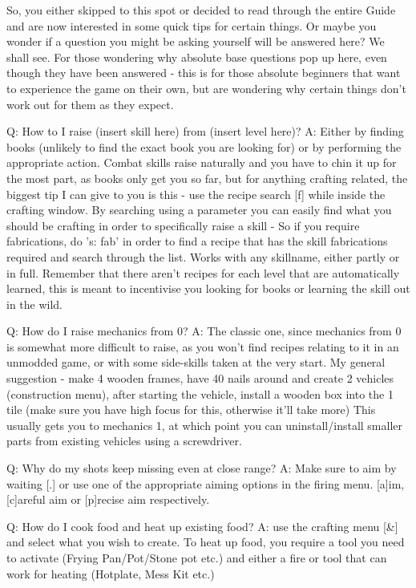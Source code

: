 \documentclass[11pt]{report}
\begin{document}
So, you either skipped to this spot or decided to read through the entire Guide and are now interested in some quick tips for certain things. Or maybe you wonder if a question you might be asking yourself will be answered here? We shall see. For those wondering why absolute base questions pop up here, even though they have been answered - this is for those absolute beginners that want to experience the game on their own, but are wondering why certain things don't work out for them as they expect.

Q: How to I raise (insert skill here) from (insert level here)?
A: Either by finding books (unlikely to find the exact book you are looking for) or by performing the appropriate action. Combat skills raise naturally and you have to chin it up for the most part, as books only get you so far, but for anything crafting related, the biggest tip I can give to you is this - use the recipe search [f] while inside the crafting window.
By searching using a parameter you can easily find what you should be crafting in order to specifically raise a skill - So if you require fabrications, do 's: fab' in order to find a recipe that has the skill fabrications required and search through the list. Works with any skillname, either partly or in full. Remember that there aren't recipes for each level that are automatically learned, this is meant to incentivise you looking for books or learning the skill out in the wild.

Q: How do I raise mechanics from 0?
A: The classic one, since mechanics from 0 is somewhat more difficult to raise, as you won't find recipes relating to it in an unmodded game, or with some side-skills taken at the very start.
My general suggestion - make 4 wooden frames, have 40 nails around and create 2 vehicles (construction menu), after starting the vehicle, install a wooden box into the 1 tile (make sure you have high focus for this, otherwise it'll take more)
This usually gets you to mechanics 1, at which point you can uninstall/install smaller parts from existing vehicles using a screwdriver.

Q: Why do my shots keep missing even at close range?
A: Make sure to aim by waiting [.] or use one of the appropriate aiming options in the firing menu. [a]im, [c]areful aim or [p]recise aim respectively.

Q: How do I cook food and heat up existing food?
A: use the crafting menu [\&] and select what you wish to create. To heat up food, you require a tool you need to activate (Frying Pan/Pot/Stone pot etc.) and either a fire or tool that can work for heating (Hotplate, Mess Kit etc.)
\end{document}
